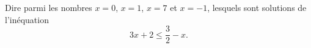 
\begin{exercice}\label{exosmath-0341}

    Dire parmi les nombres  \( x=0\), \( x=1\), \( x=7\) et \( x=-1\), lesquels sont solutions de l'inéquation
    \begin{equation}
        3x+2\leq \frac{ 3 }{ 2 }-x.
    \end{equation}

\end{exercice}
